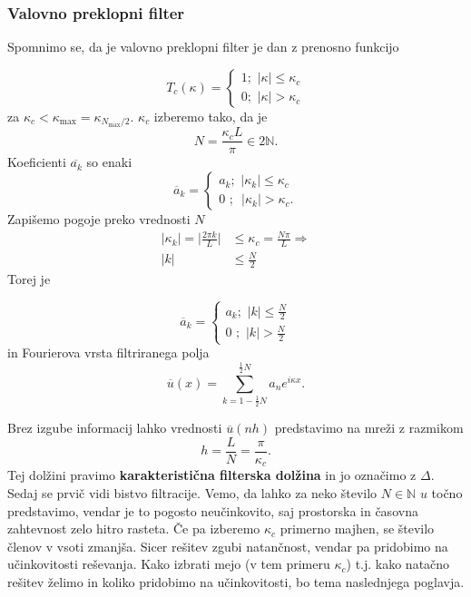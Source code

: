 \documentclass[mat2, tisk]{fmfdelo}
\newcommand{\N}{\mathbb N}
\begin{document}
\subsubsection{Valovno preklopni filter}

Spomnimo se, da je valovno preklopni filter je dan z prenosno 
funkcijo 

$$
T_c(\kappa)=\begin{cases}
  1 ;\,\, |\kappa| \leq \kappa_c \\
  0 ;\,\, |\kappa| > \kappa_c
\end{cases}
$$
za $\kappa_c < \kappa_\text{max} = \kappa_{N_\text{max}/2}$. $\kappa_c$
izberemo tako, da je 
$$
N = \frac{\kappa_c L}{\pi} \in 2\N.
$$
Koeficienti $\overline{a_k}$ so enaki 
$$
\overline{a}_k=\begin{cases}
  a_k ;\,\, |\kappa_k| \leq \kappa_c \\
  0 \,\,;\,\,\, |\kappa_k| > \kappa_c.
\end{cases}
$$
Zapišemo pogoje preko vrednosti $N$
\begin{align*}
|\kappa_k| = \Big| \frac{2\pi k}{L} \Big| &\leq \kappa_c = \frac{N\pi}{L} \Longrightarrow\\[1mm]
|k| &\leq \frac{N}{2}
\end{align*}
Torej je

$$
\overline{a}_k= \begin{cases}a_k ;\,\, |k| \leq \frac{N}{2} \\ 0 \,\,;\,\, |k| > \frac{N}{2}\end{cases}
$$
in Fourierova vrsta filtriranega polja 
\begin{equation}
\label{Fourier_število}
\overline{u}(x) = \sum_{k = 1 - \frac{1}{2}N}^{\frac{1}{2}N} a_n e^{i\kappa x}.
\end{equation}

Brez izgube informacij lahko vrednosti $\overline{u}(nh)$ predstavimo na mreži 
z razmikom 
\begin{equation}
h = \frac{L}{N} = \frac{\pi}{\kappa_c}.
\end{equation}
Tej dolžini pravimo \textbf{karakteristična filterska dolžina} in jo 
označimo z $\Delta$. 
\noindent
Sedaj se prvič vidi bistvo filtracije. Vemo, da lahko za neko število 
$N\in \N$ $u$ točno predstavimo, vendar je to pogosto neučinkovito, 
saj prostorska in časovna zahtevnost zelo hitro rasteta. Če pa izberemo
$\kappa_c$ primerno majhen, se število členov v vsoti zmanjša.
Sicer rešitev zgubi natančnost, vendar pa pridobimo na učinkovitosti reševanja. 
Kako izbrati mejo (v tem primeru $\kappa_c$) t.j. kako natačno
rešitev želimo in koliko pridobimo na učinkovitosti, bo tema naslednjega poglavja.
\end{document}
